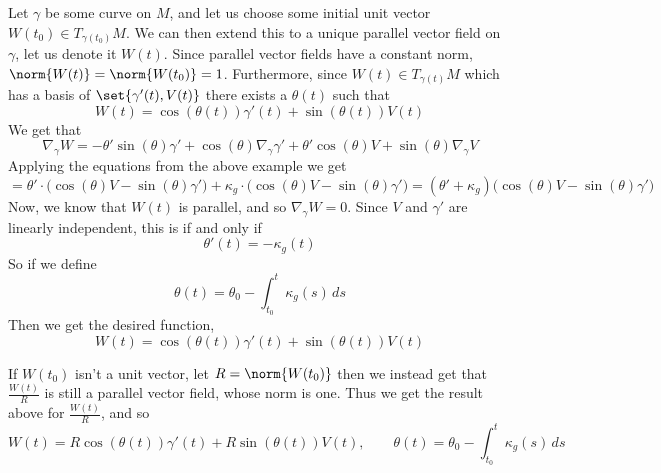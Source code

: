 Let $\gamma$ be some curve on $M$, and let us choose some initial unit vector $W(t_0)\in T_{\gamma(t_0)}M$.
We can then extend this to a unique parallel vector field on $\gamma$, let us denote it $W(t)$.
Since parallel vector fields have a constant norm, $\norm{W(t)}=\norm{W(t_0)}=1$.
Furthermore, since $W(t)\in T_{\gamma(t)}M$ which has a basis of $\set{\gamma'(t),V(t)}$ there exists a $\theta(t)$ such that
\[ W(t) = \cos(\theta(t))\gamma'(t) + \sin(\theta(t))V(t) \]
We get that
\[ \nabla_\gamma W = -\theta'\sin(\theta)\gamma' + \cos(\theta)\nabla_\gamma\gamma' + \theta'\cos(\theta)V + \sin(\theta)\nabla_\gamma V \]
Applying the equations from the above example we get
\[ = \theta'\cdot\bigl(\cos(\theta)V - \sin(\theta)\gamma'\bigr) + \kappa_g\cdot\bigl(\cos(\theta)V - \sin(\theta)\gamma'\bigr) = (\theta'+\kappa_g)\bigl(\cos(\theta)V - \sin(\theta)\gamma'\bigr) \]
Now, we know that $W(t)$ is parallel, and so $\nabla_\gamma W=0$.
Since $V$ and $\gamma'$ are linearly independent, this is if and only if
\[ \theta'(t) = -\kappa_g(t) \]
So if we define
\[ \theta(t) = \theta_0 - \int_{t_0}^t \kappa_g(s)\,ds \]
Then we get the desired function,
\[ W(t) = \cos(\theta(t))\gamma'(t) + \sin(\theta(t))V(t) \]

If $W(t_0)$ isn't a unit vector, let $R=\norm{W(t_0)}$ then we instead get that $\frac{W(t)}R$ is still a parallel vector field, whose norm is one.
Thus we get the result above for $\frac{W(t)}R$, and so
\[ W(t) = R\cos(\theta(t))\gamma'(t) + R\sin(\theta(t))V(t),\qquad \theta(t) = \theta_0 - \int_{t_0}^t \kappa_g(s)\,ds \]
\newpage

